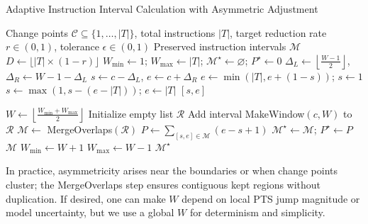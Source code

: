 \begin{algorithm}[!htbp]
\small
\setlength{\textfloatsep}{4pt}
\caption{Adaptive Instruction Interval Calculation with Asymmetric Adjustment}
\label{alg:adaptive_window}
\begin{algorithmic}[1]
\Require Change points \(\mathcal{C}\subseteq\{1,\ldots,|T|\}\), total instructions \(|T|\), target reduction rate \(r\in(0,1)\), tolerance \(\epsilon\in(0,1)\)
\Ensure Preserved instruction intervals \(\mathcal{M}\)
\State \(D \gets \lfloor |T| \times (1 - r) \rfloor\) 
\State \(W_{\min} \gets 1\); \(W_{\max} \gets |T|\); \(\mathcal{M}^\star \gets \varnothing\); \(P^\star \gets 0\)
  \State \(\Delta_L \gets \left\lfloor \frac{W-1}{2} \right\rfloor\), \(\Delta_R \gets W-1-\Delta_L\)
  \State \(s \gets c - \Delta_L\), \(e \gets c + \Delta_R\)
   
    \State \(e \gets \min(|T|, e + (1 - s))\); \(s \gets 1\)
  \EndIf
   
    \State \(s \gets \max(1, s - (e - |T|))\); \(e \gets |T|\)
  \EndIf
  \State \Return \([s,e]\)
\EndFunction

    \State \(W \gets \left\lfloor \frac{W_{\min} + W_{\max}}{2} \right\rfloor\)
    \State Initialize empty list \(\mathcal{R}\)
        \State Add interval  {MakeWindow}$(c,W)$ to \(\mathcal{R}\)
    \EndFor
    \State \(\mathcal{M} \gets\) MergeOverlaps\((\mathcal{R})\)
    \State \(P \gets \sum_{[s,e] \in \mathcal{M}} (e - s + 1)\)
     \(\mathcal{M}^\star \gets \mathcal{M}\); \(P^\star \gets P\) \EndIf
     \Return \(\mathcal{M}\) \EndIf
     \State \(W_{\min} \gets W + 1\) \Else \State \(W_{\max} \gets W - 1\) \EndIf
\EndWhile
\State \Return \(\mathcal{M}^\star\) 
\end{algorithmic}
\end{algorithm}

In practice, asymmetricity arises near the boundaries or when change points cluster; the MergeOverlaps step ensures contiguous kept regions without duplication. If desired, one can make \(W\) depend on local PTS jump magnitude or model uncertainty, but we use a global \(W\) for determinism and simplicity.

